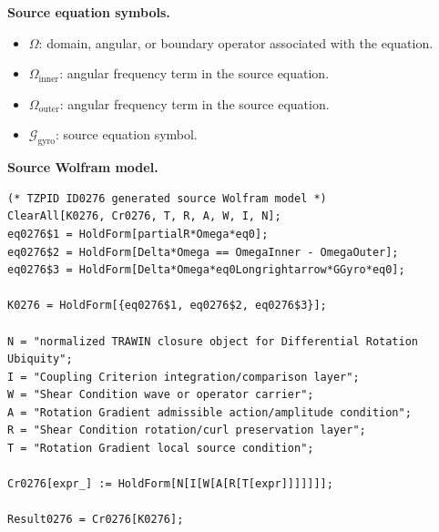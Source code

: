 \begin{minipage}[t]{0.49\linewidth}
\begingroup
\small
\raggedright
\textbf{Source equation symbols.}\par
\begin{itemize}[leftmargin=1.35em,itemsep=1pt,topsep=1pt,parsep=0pt]
    \item $\Omega$: domain, angular, or boundary operator associated with the equation.
    \item $\Omega_{\mathrm{inner}}$: angular frequency term in the source equation.
    \item $\Omega_{\mathrm{outer}}$: angular frequency term in the source equation.
    \item $\mathcal{G}_{\mathrm{gyro}}$: source equation symbol.
\end{itemize}
\endgroup
\end{minipage}\hfill
\begin{minipage}[t]{0.47\linewidth}
\begingroup
\scriptsize
\raggedright
\textbf{Source Wolfram model.}\par
\begin{Verbatim}[fontsize=\tiny,breaklines=true,breakanywhere=true]
(* TZPID ID0276 generated source Wolfram model *)
ClearAll[K0276, Cr0276, T, R, A, W, I, N];
eq0276$1 = HoldForm[partialR*Omega*eq0];
eq0276$2 = HoldForm[Delta*Omega == OmegaInner - OmegaOuter];
eq0276$3 = HoldForm[Delta*Omega*eq0Longrightarrow*GGyro*eq0];

K0276 = HoldForm[{eq0276$1, eq0276$2, eq0276$3}];

N = "normalized TRAWIN closure object for Differential Rotation Ubiquity";
I = "Coupling Criterion integration/comparison layer";
W = "Shear Condition wave or operator carrier";
A = "Rotation Gradient admissible action/amplitude condition";
R = "Shear Condition rotation/curl preservation layer";
T = "Rotation Gradient local source condition";

Cr0276[expr_] := HoldForm[N[I[W[A[R[T[expr]]]]]]];

Result0276 = Cr0276[K0276];
\end{Verbatim}
\endgroup
\end{minipage}

